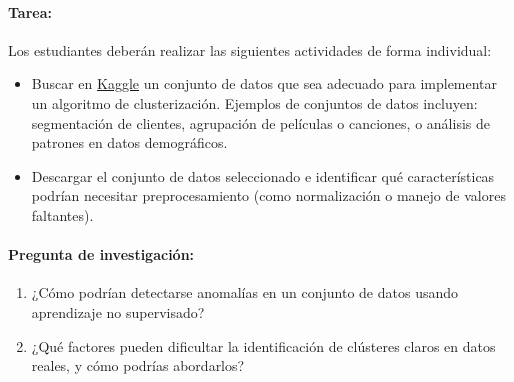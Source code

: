 \documentclass[a4,11pt]{aleph-notas}
\begin{document}
\paragraph{Tarea:}  
Los estudiantes deberán realizar las siguientes actividades de forma individual:
\begin{itemize}[leftmargin=*]
    \item Buscar en \href{https://www.kaggle.com/}{Kaggle} un conjunto de datos que sea adecuado para implementar un algoritmo de clusterización. Ejemplos de conjuntos de datos incluyen: segmentación de clientes, agrupación de películas o canciones, o análisis de patrones en datos demográficos.
    \item Descargar el conjunto de datos seleccionado e identificar qué características podrían necesitar preprocesamiento (como normalización o manejo de valores faltantes).
\end{itemize}

\paragraph{Pregunta de investigación:}  
\begin{enumerate}[leftmargin=*]
    \item ¿Cómo podrían detectarse anomalías en un conjunto de datos usando aprendizaje no supervisado?
    \item ¿Qué factores pueden dificultar la identificación de clústeres claros en datos reales, y cómo podrías abordarlos?
\end{enumerate}
    
\end{document}
